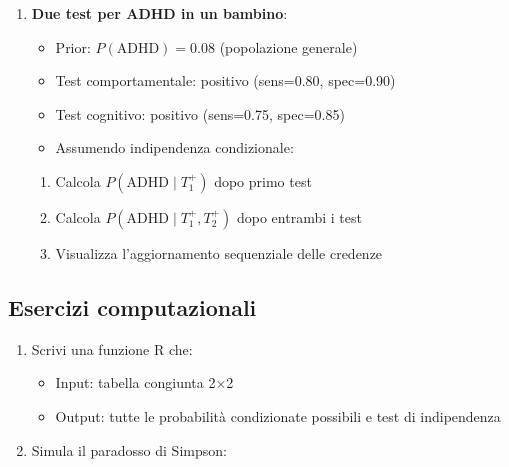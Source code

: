 \documentclass[
  letterpaper,
  DIV=11,
  numbers=noendperiod,
  oneside]{scrreprt}
\providecommand{\tightlist}{%
  \setlength{\itemsep}{0pt}\setlength{\parskip}{0pt}}
\theoremstyle{definition}
\theoremstyle{plain}
\theoremstyle{definition}
\theoremstyle{remark}
\begin{document}
\begin{tcolorbox}
\begin{enumerate}
  \begin{enumerate}
  \def\labelenumii{\alph{enumii}.}
  \tightlist
  \item
    Calcola \(P(\text{PTSD} \cap \text{Depressione})\)
  \item
    Calcola \(P(\text{PTSD} \mid \text{Depressione})\)
  \item
    Sono indipendenti? Commenta il risultato clinicamente
  \end{enumerate}
\item
  \textbf{Due test per ADHD in un bambino}:

  \begin{itemize}
  \tightlist
  \item
    Prior: \(P(\text{ADHD}) = 0.08\) (popolazione generale)
  \item
    Test comportamentale: positivo (sens=0.80, spec=0.90)
  \item
    Test cognitivo: positivo (sens=0.75, spec=0.85)
  \item
    Assumendo indipendenza condizionale:
  \end{itemize}

  \begin{enumerate}
  \def\labelenumii{\alph{enumii}.}
  \tightlist
  \item
    Calcola \(P(\text{ADHD} \mid T_1^+)\) dopo primo test
  \item
    Calcola \(P(\text{ADHD} \mid T_1^+, T_2^+)\) dopo entrambi i test
  \item
    Visualizza l'aggiornamento sequenziale delle credenze
  \end{enumerate}
\end{enumerate}

\subsection{Esercizi computazionali}\label{esercizi-computazionali-1}

\begin{enumerate}
\def\labelenumi{\arabic{enumi}.}
\setcounter{enumi}{22}
\tightlist
\item
  Scrivi una funzione R che:

  \begin{itemize}
  \tightlist
  \item
    Input: tabella congiunta 2×2
  \item
    Output: tutte le probabilità condizionate possibili e test di
    indipendenza
  \end{itemize}
\item
  Simula il paradosso di Simpson:


\end{enumerate}
\end{tcolorbox}
\end{document}
